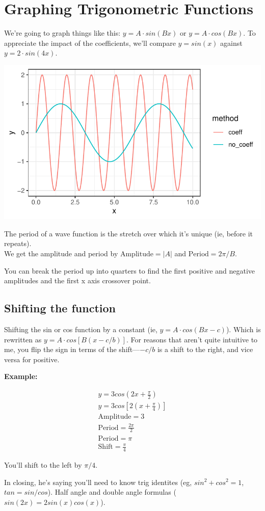 \documentclass{article}
\begin{document}
\section{Graphing Trigonometric Functions}

We're going to graph things like this: $y = A \cdot sin(Bx)$ or $y = A \cdot cos(Bx)$. To
appreciate the impact of the coefficients, we'll compare $y = sin(x)$ against $y = 2 \cdot
sin(4x)$.

\includegraphics{fig1.pdf}

The period of a wave function is the stretch over which it's unique (ie, before it
repeats). \\

We get the amplitude and period by $\text{Amplitude} = \lvert A \rvert$ and $\text{Period}
= 2 \pi / B$.

You can break the period up into quarters to find the first positive and negative
amplitudes and the first x axis crossover point.

\subsection{Shifting the function}

Shifting the sin or cos function by a constant (ie, $y = A \cdot cos(Bx - c)$). Which is
rewritten as $y = A \cdot cos[B(x - c/b)]$. For reasons that aren't quite intuitive to me,
you flip the sign in terms of the shift---$-c/b$ is a shift to the right, and vice versa
for positive.

\textbf{Example:}

\begin{align*}
y = 3cos(2x + \frac{\pi}{2})\\
y = 3cos[2(x + \frac{\pi}{4})]\\
\text{Amplitude} = 3\\
\text{Period} = \frac{2\pi}{2}\\
\text{Period} = \pi\\
\text{Shift} = \frac{\pi}{4}
\end{align*}

You'll shift to the left by $\pi/4$.


In closing, he's saying you'll need to know trig identites (eg, $sin^2 + cos^2 = 1$, $tan
= sin/cos$). Half angle and double angle formulas ($sin(2x) = 2sin(x)cos(x)$). 
\end{document}

